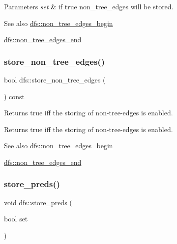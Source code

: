 \begin{DoxyParams}{Parameters}
{\em set} & if true non\+\_\+tree\+\_\+edges will be stored. \\
\hline
\end{DoxyParams}
\begin{DoxySeeAlso}{See also}
\mbox{\hyperlink{classdfs_a4efe5bb72d00305e6b226e67c2b2ef6e}{dfs\+::non\+\_\+tree\+\_\+edges\+\_\+begin}} 

\mbox{\hyperlink{classdfs_ad9cd92a18bda23edca8ab3ac60a15ef4}{dfs\+::non\+\_\+tree\+\_\+edges\+\_\+end}} 
\end{DoxySeeAlso}
\mbox{\label{classdfs_a6ac1f01ff594fbbc6e8d6b5bd03fc9ab}} 
\subsubsection{\texorpdfstring{store\+\_\+non\+\_\+tree\+\_\+edges()}{store\_non\_tree\_edges()}\hspace{0.1cm}{\footnotesize\ttfamily [2/2]}}
{\footnotesize\ttfamily bool dfs\+::store\+\_\+non\+\_\+tree\+\_\+edges (\begin{DoxyParamCaption}{ }\end{DoxyParamCaption}) const\hspace{0.3cm}{\ttfamily [inline]}}



Returns true iff the storing of non-\/tree-\/edges is enabled. 

\begin{DoxyReturn}{Returns}
true iff the storing of non-\/tree-\/edges is enabled. 
\end{DoxyReturn}
\begin{DoxySeeAlso}{See also}
\mbox{\hyperlink{classdfs_a4efe5bb72d00305e6b226e67c2b2ef6e}{dfs\+::non\+\_\+tree\+\_\+edges\+\_\+begin}} 

\mbox{\hyperlink{classdfs_ad9cd92a18bda23edca8ab3ac60a15ef4}{dfs\+::non\+\_\+tree\+\_\+edges\+\_\+end}} 
\end{DoxySeeAlso}
\mbox{\label{classdfs_a7043f46eb3887cbcbb1391fc783407a4}} 
\subsubsection{\texorpdfstring{store\+\_\+preds()}{store\_preds()}\hspace{0.1cm}{\footnotesize\ttfamily [1/2]}}
{\footnotesize\ttfamily void dfs\+::store\+\_\+preds (\begin{DoxyParamCaption}\item[{bool}]{set }\end{DoxyParamCaption})}



